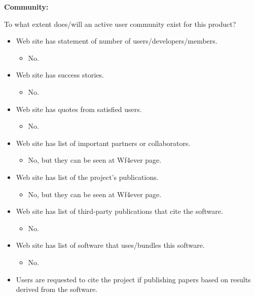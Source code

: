 \textbf{Community:}

To what extent does/will an active user community exist for this
product?

\begin{itemize}
\itemsep1pt\parskip0pt
\item
  Web site has statement of number of users/developers/members.

  \begin{itemize}
  \itemsep1pt\parskip0pt
  \item
    No.
  \end{itemize}
\item
  Web site has success stories.

  \begin{itemize}
  \itemsep1pt\parskip0pt
  \item
    No.
  \end{itemize}
\item
  Web site has quotes from satisfied users.

  \begin{itemize}
  \itemsep1pt\parskip0pt
  \item
    No.
  \end{itemize}
\item
  Web site has list of important partners or collaborators.

  \begin{itemize}
  \itemsep1pt\parskip0pt
  \item
    No, but they can be seen at Wf4ever page.
  \end{itemize}
\item
  Web site has list of the project's publications.

  \begin{itemize}
  \itemsep1pt\parskip0pt
  \item
    No, but they can be seen at Wf4ever page.
  \end{itemize}
\item
  Web site has list of third-party publications that cite the software.

  \begin{itemize}
  \itemsep1pt\parskip0pt
  \item
    No.
  \end{itemize}
\item
  Web site has list of software that uses/bundles this software.

  \begin{itemize}
  \itemsep1pt\parskip0pt
  \item
    No.
  \end{itemize}
\item
  Users are requested to cite the project if publishing papers based on
  results derived from the software.


\end{itemize}
